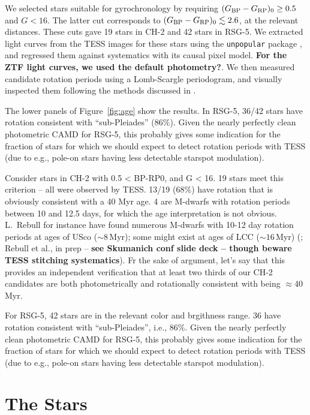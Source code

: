 \documentclass[12pt,twocolumn,linenumbers]{aastex63}
\newcommand{\bpmrpo}{(G_{\rm BP}-G_{\rm RP})_0}
\begin{document}
We selected stars suitable for gyrochronology by requiring $\bpmrpo
\geq 0.5$ and $G<16$.  The latter cut corresponds to $\bpmrpo \lesssim
2.6$, at the relevant distances.  These cuts gave 19 stars in CH-2 and
42 stars in RSG-5.  We extracted light curves from the TESS images for
these stars using the \texttt{unpopular} package
\citep{hattorio_2021_cpm}, and regressed them against systematics with
its causal pixel model.  
{\bf For the ZTF light curves, we used the default photometry?}.
We then measured candidate rotation periods
using a Lomb-Scargle periodogram, and visually inspected them
following the methods discussed in \citet{curtis_rup147_2020}.

The lower panels of Figure~\ref{fig:age} show the results.
In RSG-5,
36/42 stars have rotation consistent with ``sub-Pleiades'' (86\%).
Given the nearly perfectly clean photometric CAMD for RSG-5, this
probably gives some indication for the fraction of stars for which we
should expect
to detect rotation periods with TESS (due to e.g., pole-on stars
having less detectable starspot modulation).



Consider stars in CH-2 with 0.5 < BP-RP0, and G < 16.
19 stars meet this criterion -- all were observed by TESS.
13/19 (68\%) have rotation that is obviously consistent with a 40 Myr
age.
4 are M-dwarfs with rotation periods between 10 and 12.5 days, for which
the age interpretation is not obvious.
L.~Rebull for instance have found numerous M-dwarfs
with 10-12 day rotation periods at ages of USco ($\sim 8$\,Myr); some
might exist at ages of LCC ($\sim 16$\,Myr)
(\citealt{rebull_rotation_2020}; Rebull et al., in prep -- {\bf see
Skumanich conf slide deck -- though beware TESS stitching systematics}).
Fr the sake of argument, let's say that this provides an independent
verification that at least two thirds of our CH-2 candidates are both
photometrically and rotationally consistent with being $\approx$40
Myr.


For RSG-5, 42 stars are in the relevant color and brgithness range.
36 have rotation consistent with ``sub-Pleiades'', i.e., 86\%.
Given the nearly perfectly clean photometric CAMD for RSG-5, this
probably gives some indication for the fraction of stars for which we
should expect
to detect rotation periods with TESS (due to e.g., pole-on stars
having less detectable starspot modulation).






\section{The Stars}
\label{sec:stars}
\end{document}

